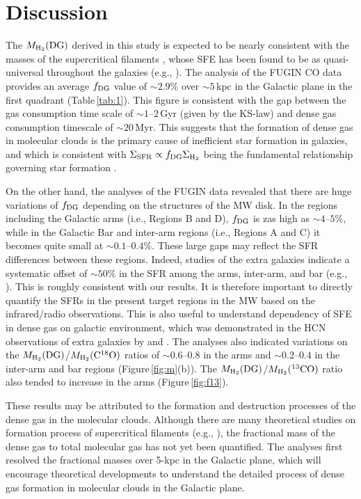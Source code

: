 \documentclass[proof]{pasj01}
\newcommand{\fDG}{f_{\rm DG}}
\newcommand{\mDG}{M_{\rm H_2}{\rm (DG)}}
\newcommand{\mthree}{M_{\rm H_2}{\rm (^{13}CO)}}
\newcommand{\meight}{M_{\rm H_2}{\rm (C^{18}O)}}
\begin{document}
\section{Discussion}
The $\mDG$ derived in this study is expected to be nearly consistent with the masses of the supercritical filaments \citep{and2014}, whose SFE has been found to be as quasi-universal throughout the galaxies (e.g., \cite{lad2010,shi2017}).
The analysis of the FUGIN CO data provides an average $\fDG$ value of $\sim2.9\%$ over $\sim5$\,kpc in the Galactic plane in the first quadrant (Table\,\ref{tab:1}).
This figure is consistent with the gap between the gas consumption time scale of $\sim1$--$2$\,Gyr (given by the KS-law) and dense gas consumption timescale of $\sim20$\,Myr.
This suggests that the formation of dense gas in molecular clouds is the primary cause of inefficient star formation in galaxies, and which is consistent with $\Sigma_{\rm SFR} \propto f_{\rm DG}\Sigma_{\rm H_2}$ being the fundamental relationship governing star formation \citep{lad2010}.

On the other hand, the analyses of the FUGIN data revealed that there are huge variations of $\fDG$ depending on the structures of the MW disk.
In the regions including the Galactic arms (i.e., Regions B and D), $\fDG$ is zas high as $\sim4$--$5\%$, while in the Galactic Bar and inter-arm regions (i.e., Regions A and C) it becomes quite small at $\sim0.1$--$0.4\%$.
These large gaps may reflect the SFR differences between these regions.
Indeed, studies of the extra galaxies indicate a systematic offset of $\sim50\%$ in the SFR among the arms, inter-arm, and bar (e.g., \cite{mom2010}). This is roughly consistent with our results.
It is therefore important to directly quantify the SFRs in the present target regions in the MW based on the infrared/radio observations.
This is also useful to understand dependency of SFE in dense gas on galactic environment, which was demonstrated in the HCN observations of extra galaxies by \citet{use2015} and \citet{big2016}. 
The analyses also indicated variations on the $\mDG$/$\meight$ ratios of $\sim0.6$--$0.8$ in the arms and $\sim0.2$--$0.4$ in the inter-arm and bar regions (Figure\,\ref{fig:m}(b)).
The $\mDG$/$\mthree$ ratio also tended to increase in the arms (Figure\,\ref{fig:f13}).

These results may be attributed to the formation and destruction processes of the dense gas in the molecular clouds.
Although there are many theoretical studies on formation process of supercritical filaments (e.g., \cite{inu2015,fed2010,hen2008}), the fractional mass of the dense gas to total molecular gas has not yet been quantified.
The analyses first resolved the fractional masses over 5-kpc in the Galactic plane, which will encourage theoretical developments to understand the detailed process of dense gas formation in molecular clouds in the Galactic plane. 
\end{document}

